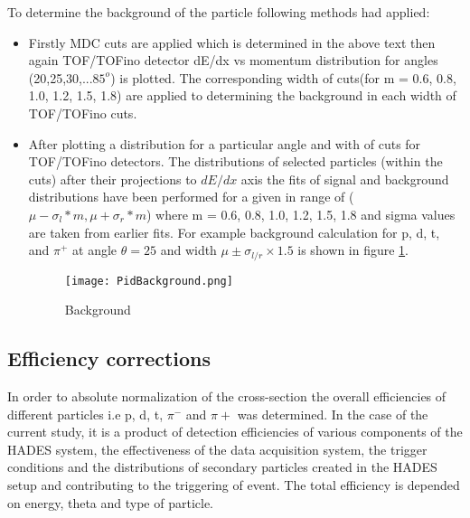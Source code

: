 To determine the background of the particle following methods had applied:
\begin{itemize}
	\item Firstly MDC cuts are applied which is determined in the above text then again TOF/TOFino detector dE/dx vs momentum distribution for angles (20,25,30,...$85^o$)  is plotted. The corresponding width of cuts(for m = 0.6, 0.8, 1.0, 1.2, 1.5, 1.8) are applied to determining the background in each width of TOF/TOFino cuts.
	\item After plotting a distribution for a particular angle and with of cuts for TOF/TOFino detectors. The distributions of selected particles (within the cuts) after their projections to $dE/dx$ axis the fits of signal and background distributions have been performed for a given in range of ($\mu-\sigma_l*m , \mu+\sigma_r*m$) where m = 0.6, 0.8, 1.0, 1.2, 1.5, 1.8 and sigma values are taken from earlier fits. For example background calculation for p, d, t, and $\pi^+$ at angle $\theta=25$ and width $\mu \pm \sigma_{l/r}\times1.5$ is shown in figure \ref{backg}.
	\begin{figure}
		\centering
		\texttt{[image: PidBackground.png]}
		\caption{Background}
		\label{backg}
	\end{figure}  
\end{itemize}



\subsection{\label{Eff_corr} Efficiency corrections}
In order to absolute normalization of the cross-section the overall efficiencies of different particles i.e p, d, t, $\pi^-$ and $\pi+$ was determined. In the case of the current study, it is a product of detection efficiencies of various components of the HADES system, the effectiveness of the data acquisition system, the trigger conditions and the distributions of secondary particles created in the HADES setup and contributing to the triggering of event. The total efficiency is depended on energy, theta and type of particle.





